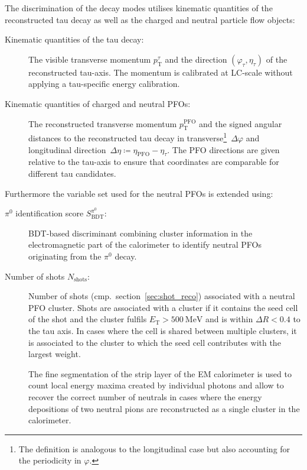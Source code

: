 The discrimination of the decay modes utilises kinematic quantities of the
reconstructed tau decay as well as the charged and neutral particle flow
objects:
\begin{description}
\item[Kinematic quantities of the tau decay:] The visible transverse momentum
  $p_\text{T}^\tau$ and the direction $(\varphi_\tau, \eta_\tau)$ of the
  reconstructed tau-axis. The momentum is calibrated at LC-scale
  without applying a tau-specific energy calibration.

\item[Kinematic quantities of charged and neutral PFOs:] The reconstructed
  transverse momentum $p_\text{T}^\text{PFO}$ and the signed angular distances
  to the reconstructed tau decay in transverse\footnote{The definition is
    analogous to the longitudinal case but also accounting for the periodicity
    in $\varphi$.}~$\Delta\varphi$ and longitudinal
  direction~$\Delta\eta \coloneqq \eta_\text{PFO} - \eta_\tau$. The PFO
  directions are given relative to the tau-axis to ensure that coordinates are
  comparable for different tau candidates.
\end{description}
Furthermore the variable set used for the neutral PFOs is extended using:
\begin{description}
\item[$\pi^0$ identification score $S_\text{BDT}^{\pi^0}$:] BDT-based
  discriminant combining cluster information in the electromagnetic part of the
  calorimeter to identify neutral PFOs originating from the $\pi^0$ decay.

\item[Number of shots $N_\text{shots}$:] Number of shots (cmp.\
  section~\ref{sec:shot_reco}) associated with a neutral PFO cluster. Shots are
  associated with a cluster if it contains the seed cell of the shot and the
  cluster fulfils $E_\text{T} > \SI{500}{\mega\electronvolt}$ and is within
  $\Delta R < 0.4$ to the tau axis. In cases where the cell is shared between
  multiple clusters, it is associated to the cluster to which the seed cell
  contributes with the largest weight.

  The fine segmentation of the strip layer of the EM calorimeter is used to
  count local energy maxima created by individual photons and allow to recover
  the correct number of neutrals in cases where the energy depositions of two
  neutral pions are reconstructed as a single cluster in the calorimeter.
\end{description}


